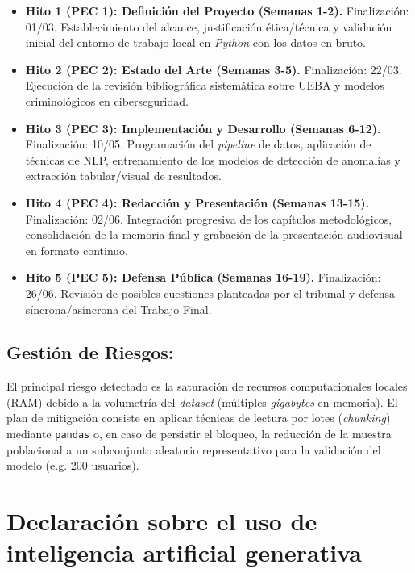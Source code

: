 \documentclass[IB]{TFUOC}%
\begin{document}
\begin{itemize}
    \item \textbf{Hito 1 (PEC 1): Definición del Proyecto (Semanas 1-2).} Finalización: 01/03. Establecimiento del alcance, justificación ética/técnica y validación inicial del entorno de trabajo local en \textit{Python} con los datos en bruto.
    \item \textbf{Hito 2 (PEC 2): Estado del Arte (Semanas 3-5).} Finalización: 22/03. Ejecución de la revisión bibliográfica sistemática sobre UEBA y modelos criminológicos en ciberseguridad.
    \item \textbf{Hito 3 (PEC 3): Implementación y Desarrollo (Semanas 6-12).} Finalización: 10/05. Programación del \textit{pipeline} de datos, aplicación de técnicas de NLP, entrenamiento de los modelos de detección de anomalías y extracción tabular/visual de resultados.
    \item \textbf{Hito 4 (PEC 4): Redacción y Presentación (Semanas 13-15).} Finalización: 02/06. Integración progresiva de los capítulos metodológicos, consolidación de la memoria final y grabación de la presentación audiovisual en formato continuo.
    \item \textbf{Hito 5 (PEC 5): Defensa Pública (Semanas 16-19).} Finalización: 26/06. Revisión de posibles cuestiones planteadas por el tribunal y defensa síncrona/asíncrona del Trabajo Final.
\end{itemize}

\subsection{Gestión de Riesgos:}

El principal riesgo detectado es la saturación de recursos computacionales locales (RAM) debido a la volumetría del \textit{dataset} (múltiples \textit{gigabytes} en memoria). El plan de mitigación consiste en aplicar técnicas de lectura por lotes (\textit{chunking}) mediante \texttt{pandas} o, en caso de persistir el bloqueo, la reducción de la muestra poblacional a un subconjunto aleatorio representativo para la validación del modelo (e.g. 200 usuarios).

\section{Declaración sobre el uso de inteligencia artificial generativa}
\end{document}

